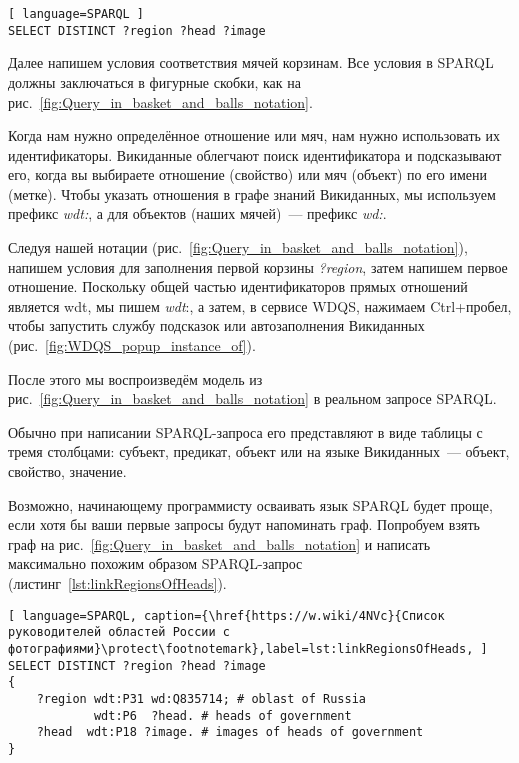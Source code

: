 \begin{lstlisting}[ language=SPARQL ]
SELECT DISTINCT ?region ?head ?image
\end{lstlisting}

Далее напишем условия соответствия мячей корзинам. Все условия в SPARQL должны заключаться в фигурные скобки, как на рис.~\ref{fig:Query_in_basket_and_balls_notation}.

Когда нам нужно определённое отношение или мяч, нам нужно использовать их идентификаторы. Викиданные облегчают поиск идентификатора и подсказывают его, когда вы выбираете отношение (свойство) или мяч (объект) по его имени (метке). Чтобы указать отношения в графе знаний Викиданных, мы используем префикс \textit{wdt:}, а для объектов (наших мячей)~--- префикс \textit{wd:}.

Следуя нашей нотации (рис.~\ref{fig:Query_in_basket_and_balls_notation}), напишем условия для заполнения первой корзины \textit{?region}, затем напишем первое отношение. Поскольку общей частью идентификаторов прямых отношений является wdt, мы пишем \textit{wdt}:, а затем, в сервисе WDQS, нажимаем Ctrl+пробел, чтобы запустить службу подсказок или  автозаполнения Викиданных (рис.~\ref{fig:WDQS_popup_instance_of}).

\begin{marginfigure}[-2.5cm]
	{
		\setlength{\fboxsep}{0pt}%
		\setlength{\fboxrule}{1pt}%
	}
    \caption[Меню автозаполнения свойства Викиданых в сервисе WDQS.]{С помощью команды Ctrl+пробел открылось выпадающее контекстное меню автозаполнения свойства Викиданых.}
	\label{fig:WDQS_popup_instance_of}
\end{marginfigure}

После этого мы воспроизведём модель из рис.~\ref{fig:Query_in_basket_and_balls_notation} в реальном запросе SPARQL.

Обычно при написании SPARQL-запроса его представляют в виде таблицы с тремя столбцами: субъект, предикат, объект или на языке Викиданных~--- объект, свойство, значение.

Возможно, начинающему программисту осваивать язык SPARQL будет проще, если хотя бы ваши первые запросы будут напоминать граф. Попробуем взять граф на рис.~\ref{fig:Query_in_basket_and_balls_notation} и написать максимально похожим образом SPARQL-запрос (листинг~\ref{lst:linkRegionsOfHeads}).

\begin{lstlisting}[ language=SPARQL, caption={\href{https://w.wiki/4NVc}{Список руководителей областей России с фотографиями}\protect\footnotemark},label=lst:linkRegionsOfHeads, ]
SELECT DISTINCT ?region ?head ?image
{
    ?region wdt:P31 wd:Q835714; # oblast of Russia
            wdt:P6  ?head. # heads of government
    ?head  wdt:P18 ?image. # images of heads of government
}
\end{lstlisting}

